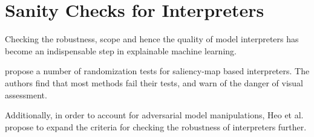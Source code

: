 \section{Sanity Checks for Interpreters}
\label{sec:sanity_checks_for_interpreters}

Checking the robustness, scope and hence the quality of model interpreters has become an indispensable step in explainable machine learning. 

\cite{adebayo2018sanity} propose a number of randomization tests for saliency-map based interpreters.
The authors find that most methods fail their tests, and warn of the danger of visual assessment. 
 



Additionally, in order to account for adversarial model manipulations, Heo et al. \cite{fooling_nn_interpreters} propose to expand the criteria for checking the robustness of interpreters further.